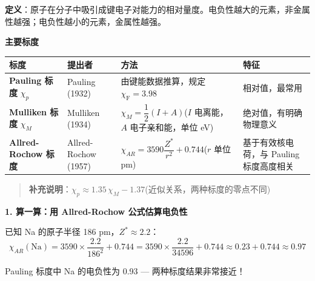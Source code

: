 \documentclass[a4paper,11pt]{ctexart}
\newcounter{none}
\newcommand{\箭}{\ensuremath{\rightarrow}}
\newcommand{\左箭}{\ensuremath{\leftarrow}}
\newcommand{\上箭}{\ensuremath{\uparrow}}
\newcommand{\下箭}{\ensuremath{\downarrow}}
\newcommand{\衡}{\ensuremath{\rightleftharpoons}}
\newcommand{\双箭}{\ensuremath{\leftrightarrow}}
\newcommand{\约等于}{\ensuremath{\approx}}
\newcommand{\小于等于}{\ensuremath{\leq}}
\newcommand{\大于等于}{\ensuremath{\geq}}
\newcommand{\不等于}{\ensuremath{\neq}}
\newcommand{\西格马}{\ensuremath{\sigma}}
\newcommand{\派}{\ensuremath{\pi}}
\begin{document}
\textbf{定义}：原子在分子中吸引成键电子对能力的相对量度。电负性越大的元素，非金属性越强；电负性越小的元素，金属性越强。

\textbf{主要标度}

{\def\LTcaptype{none} %
\begin{longtable}[]{@{}
  >{\raggedright\arraybackslash}p{}
  >{\raggedright\arraybackslash}p{}
  >{\raggedright\arraybackslash}p{}
  >{\raggedright\arraybackslash}p{}@{}}
\toprule\noalign{}
\begin{minipage}[b]{\linewidth}\raggedright
标度
\end{minipage} & \begin{minipage}[b]{\linewidth}\raggedright
提出者
\end{minipage} & \begin{minipage}[b]{\linewidth}\raggedright
方法
\end{minipage} & \begin{minipage}[b]{\linewidth}\raggedright
特征
\end{minipage} \\
\midrule\noalign{}
\endhead
\bottomrule\noalign{}
\endlastfoot
\textbf{Pauling 标度} \(\chi_p\) & Pauling (1932) & 由键能数据推算，规定 \(\chi_{\mathrm{F}}=3.98\) & 相对值，最常用 \\
\textbf{Mulliken 标度} \(\chi_M\) & Mulliken (1934) & \(\chi_M = \dfrac{1}{2}(I + A)\)(\(I\) 电离能，\(A\) 电子亲和能，单位 eV) & 绝对值，有明确物理意义 \\
\textbf{Allred-Rochow 标度} & Allred-Rochow (1957) & \(\chi_{AR} = 3590\dfrac{Z^*}{r^2} + 0.744\)(\(r\) 单位 pm) & 基于有效核电荷，与 Pauling 标度高度相关 \\
\end{longtable}
}

\begin{quote}
\textbf{补充说明}：\(\chi_p \approx 1.35\,\chi_M - 1.37\)(近似关系，两种标度的零点不同)
\end{quote}

\textbf{1. 算一算：用 Allred-Rochow 公式估算电负性}

已知 Na 的原子半径 186 pm，\(Z^* \approx 2.2\)：
\[\chi_{AR}(\mathrm{Na}) = 3590 \times \frac{2.2}{186^2} + 0.744 = 3590 \times \frac{2.2}{34596} + 0.744 \approx 0.23 + 0.744 \approx 0.97\]

Pauling 标度中 Na 的电负性为 0.93 --- 两种标度结果非常接近！
\end{document}
